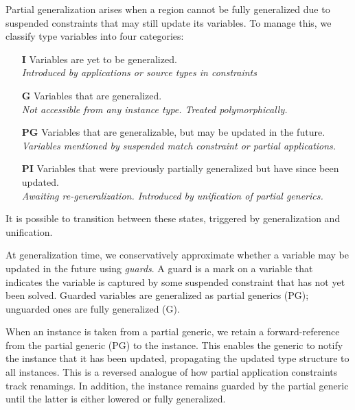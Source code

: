 \documentclass[acmsmall,screen,nonacm,review]{acmart}
\begin{document}
Partial generalization arises when a region cannot be fully
generalized due to suspended constraints that may still update
its variables. To manage this, we classify type variables
into four categories:

\begin{itemize}
  \item[\textbf{I}] Variables are yet to be generalized. \\
    \emph{Introduced by applications or source types in constraints} \\

  \item[\textbf{G}] Variables that are generalized. \\
    \emph{Not accessible from any instance type. Treated polymorphically.} \\

  \item[\textbf{PG}] Variables that are generalizable, but may be
    updated in the future. \\
    \emph{Variables mentioned by suspended match constraint or partial applications.} \\

  \item[\textbf{PI}] Variables that were previously partially generalized
    but have since been updated.  \\
    \emph{Awaiting re-generalization. Introduced by unification of partial generics.}
\end{itemize}


It is possible to transition between these states, triggered by generalization
and unification.

At generalization time, we conservatively approximate whether a variable may be
updated in the future using \emph{guards}. A guard is a mark on a variable that
indicates the variable is captured by some suspended constraint that has not
yet been solved. Guarded variables are generalized as partial generics (PG);
unguarded ones are fully generalized (G).

When an instance is taken from a partial generic, we retain a forward-reference
from the partial generic (PG) to the instance. This enables the generic to
notify the instance that it has been updated, propagating the updated type
structure to all instances. This is a reversed analogue of how partial
application constraints track renamings. In addition, the instance remains
guarded by the partial generic until the latter is either lowered or fully
generalized.
\end{document}
